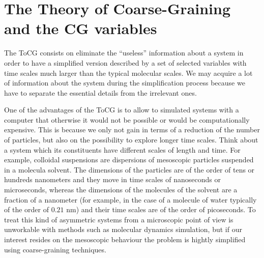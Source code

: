 \documentclass[b5paper,openright,11pt]{book}
\begin{document}

%
%
\section{The Theory of Coarse-Graining and the CG variables}
The ToCG consists on eliminate the ``useless'' information about a system in order to have a simplified version described by a set of selected variables with time scales much larger than the typical molecular scales. 
We may acquire a lot of information about the system during the simplification process because we have to separate the essential details from the irrelevant ones. 

One of the advantages of the ToCG is to allow to simulated systems with a computer that otherwise it would not be possible or would be computationally expensive. 
This is because we only not gain in terms of a reduction of the number of particles, but also on the possibility to explore longer time scales. 
Think about a system which its constituents have different scales of length and time.
For example, colloidal suspensions are dispersions of mesoscopic particles suspended in a molecula solvent.
The dimensions of the particles are of the order of tens or hundreds nanometers and they move in time scales of nanoseconds or microseconds, whereas the dimensions of the molecules of the solvent are a fraction of a nanometer (for example, in the case of a molecule of water typically of the order of $0.21$ nm) and their time scales are of the order of picoseconds. To treat this kind of asymmetric systems from a microscopic point of view is unworkable with methods such as molecular dynamics simulation, but if our interest resides on the mesoscopic behaviour the problem is hightly simplified using coarse-graining techniques.    
\end{document}
